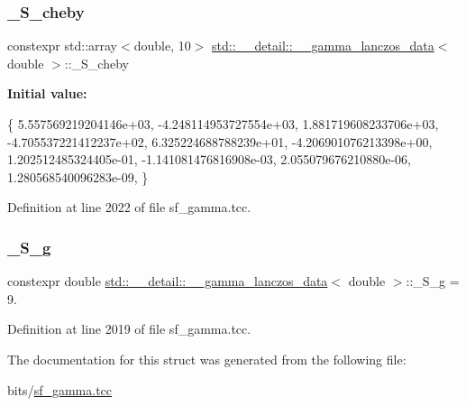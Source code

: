 \subsubsection{\texorpdfstring{\+\_\+\+S\+\_\+cheby}{\_S\_cheby}}
{\footnotesize\ttfamily constexpr std\+::array$<$double, 10$>$ \hyperlink{structstd_1_1____detail_1_1____gamma__lanczos__data}{std\+::\+\_\+\+\_\+detail\+::\+\_\+\+\_\+gamma\+\_\+lanczos\+\_\+data}$<$ double $>$\+::\+\_\+\+S\+\_\+cheby\hspace{0.3cm}{\ttfamily [static]}}

{\bfseries Initial value\+:}
\begin{DoxyCode}
\{
     5.557569219204146e+03,
    -4.248114953727554e+03,
     1.881719608233706e+03,
    -4.705537221412237e+02,
     6.325224688788239e+01,
    -4.206901076213398e+00,
     1.202512485324405e-01,
    -1.141081476816908e-03,
     2.055079676210880e-06,
     1.280568540096283e-09,
      \}
\end{DoxyCode}


Definition at line 2022 of file sf\+\_\+gamma.\+tcc.

\mbox{\label{structstd_1_1____detail_1_1____gamma__lanczos__data_3_01double_01_4_ab7959ed84fcc00db67df8b167165513d}} 
\subsubsection{\texorpdfstring{\+\_\+\+S\+\_\+g}{\_S\_g}}
{\footnotesize\ttfamily constexpr double \hyperlink{structstd_1_1____detail_1_1____gamma__lanczos__data}{std\+::\+\_\+\+\_\+detail\+::\+\_\+\+\_\+gamma\+\_\+lanczos\+\_\+data}$<$ double $>$\+::\+\_\+\+S\+\_\+g = 9.\hspace{0.3cm}{\ttfamily [static]}}



Definition at line 2019 of file sf\+\_\+gamma.\+tcc.



The documentation for this struct was generated from the following file\+:\begin{DoxyCompactItemize}
\item 
bits/\hyperlink{sf__gamma_8tcc}{sf\+\_\+gamma.\+tcc}\end{DoxyCompactItemize}
